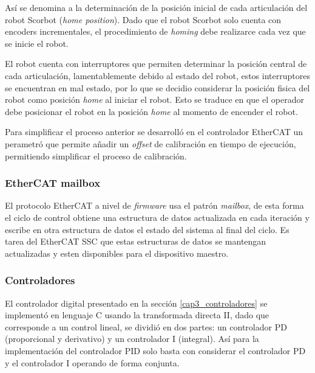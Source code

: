 Así se denomina a la determinación de la posición inicial de cada articulación del robot Scorbot (\textit{home position}). Dado que el robot Scorbot solo cuenta con encoders incrementales, el procedimiento de \textit{homing} debe realizarce cada vez que se inicie el robot.

El robot cuenta con interruptores que permiten determinar la posición central de cada articulación, lamentablemente debido al estado del robot, estos interruptores se encuentran en mal estado, por lo que se decidio considerar la posición fisica del robot como posición \textit{home} al iniciar el robot. Esto se traduce en que el operador debe posicionar el robot en la posición \textit{home} al momento de encender el robot.

Para simplificar el proceso anterior se desarrolló en el controlador EtherCAT un perametró que permite añadir un \textit{offset} de calibración en tiempo de ejecución, permitiendo simplificar el proceso de calibración.

\subsubsection{EtherCAT mailbox}

El protocolo EtherCAT a nivel de \textit{firmware} usa el patrón \textit{mailbox}, de esta forma el ciclo de control obtiene una estructura de datos actualizada en cada iteración y escribe en otra estructura de datos el estado del sistema al final del ciclo. Es tarea del EtherCAT SSC que estas estructuras de datos se mantengan actualizadas y esten disponibles para el dispositivo maestro.
 
\subsubsection{Controladores}

El controlador digital presentado en la sección \ref{cap3_controladores} se implementó en lenguaje C usando la transformada directa II, dado que corresponde a un control lineal, se dividió en dos partes: un controlador PD (proporcional y derivativo) y un controlador I (integral). Así para la implementación del controlador PID solo basta con considerar el controlador PD y el controlador I operando de forma conjunta.

